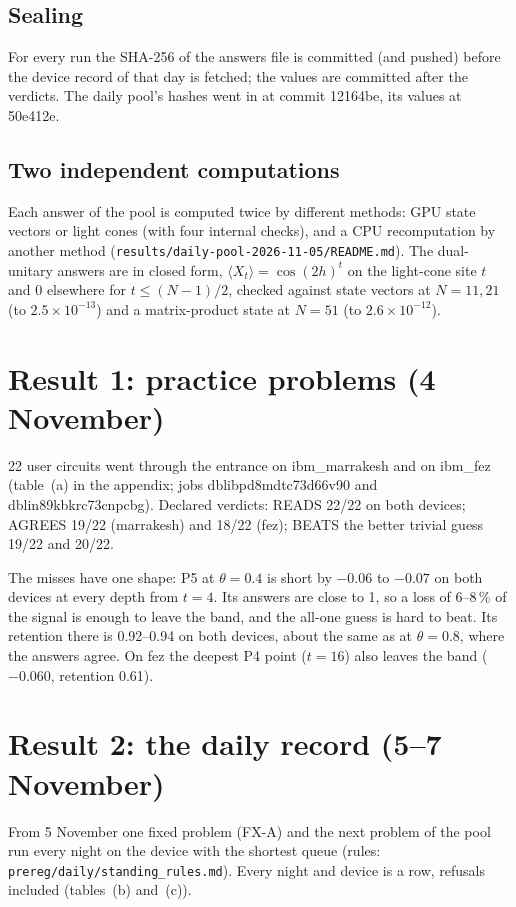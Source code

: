 \documentclass[10pt,a4paper]{article}
\begin{document}
\subsection{Sealing}
For every run the SHA-256 of the answers file is committed (and pushed) before the device record of that day is
fetched; the values are committed after the verdicts. The daily pool's hashes went in at commit 12164be, its values
at 50e412e.

\subsection{Two independent computations}
Each answer of the pool is computed twice by different methods: GPU state vectors or light cones (with four internal
checks), and a CPU recomputation by another method (\texttt{results/daily-pool-2026-11-05/README.md}). The
dual-unitary answers are in closed form, $\langle X_t \rangle = \cos(2h)^t$ on the light-cone site $t$ and 0
elsewhere for $t \le (N-1)/2$, checked against state vectors at $N = 11, 21$ (to $2.5\times10^{-13}$) and a
matrix-product state at $N = 51$ (to $2.6\times10^{-12}$).

\section{Result 1: practice problems (4 November)}\label{sec:practice}
22 user circuits went through the entrance on ibm\_marrakesh and on ibm\_fez (table~(a) in the appendix; jobs
dblibpd8mdtc73d66v90 and dblin89kbkrc73cnpcbg). Declared verdicts: READS 22/22 on both devices; AGREES 19/22
(marrakesh) and 18/22 (fez); BEATS the better trivial guess 19/22 and 20/22.

The misses have one shape: P5 at $\theta = 0.4$ is short by $-0.06$ to $-0.07$ on both devices at every depth from
$t = 4$. Its answers are close to 1, so a loss of 6--8\,\% of the signal is enough to leave the band, and the all-one
guess is hard to beat. Its retention there is 0.92--0.94 on both devices, about the same as at $\theta = 0.8$, where
the answers agree. On fez the deepest P4 point ($t = 16$) also leaves the band ($-0.060$, retention 0.61).

\section{Result 2: the daily record (5--7 November)}\label{sec:daily}
From 5 November one fixed problem (FX-A) and the next problem of the pool run every night on the device with the
shortest queue (rules: \texttt{prereg/daily/standing\_rules.md}). Every night and device is a row, refusals included
(tables~(b) and~(c)).
\end{document}
